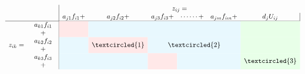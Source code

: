 \documentclass{ltjsbook}
\begin{document}
\begin{figure}[ht]
    \[
        \begin{array}{rl|cccccc|}
                    &                                                       & \multicolumn{6}{c}{z_{ij}=}                                                                                                                                                                                                                                                                                                        \\
                    &                                                       & a_{j1}f_{i1} +                                                          & a_{j2}f_{i2}+                                                            & a_{j3}f_{i3} +                                                         & \cdots\cdots +                                                          & a_{jm}f_{im} + & d_jU_{ij} \\\hline
                    & \begin{array}{c}a_{k1}f_{i1}\\+\end{array}            & \multicolumn{1}{>{\columncolor{red!9}}c}{}                              & \multicolumn{4}{>{\columncolor{cyan!9}}c}{}                              & \multicolumn{1}{>{\columncolor{green!9}}c}{}                                                                                                                                  \\
            z_{ik}= & \begin{array}{c}a_{k2}f_{i2}\\+\end{array}            & \multicolumn{1}{>{\columncolor{cyan!9}}c}{}                             & \multicolumn{1}{>{\columncolor{red!9}}c}{\textcircled{\scriptsize 1}}    & \multicolumn{3}{>{\columncolor{cyan!9}}c}{\textcircled{\scriptsize 2}} & \multicolumn{1}{>{\columncolor{green!9}}c}{}                                                         \\
                    & \begin{array}{c}a_{k3}f_{i3}\\+\end{array}            & \multicolumn{2}{>{\columncolor{cyan!9}}c}{}                             & \multicolumn{1}{>{\columncolor{red!9}}c}{}                               & \multicolumn{2}{>{\columncolor{cyan!9}}c}{}                            & \multicolumn{1}{>{\columncolor{green!9}}c}{\textcircled{\scriptsize 3}}                              \\

\end{array}\]
\end{figure}
\end{document}
